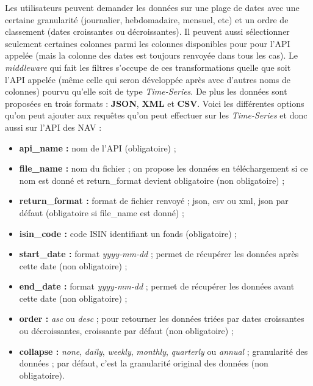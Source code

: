 \vspace{3mm}

Les utilisateurs peuvent demander les données sur une plage de dates avec une certaine granularité (journalier, hebdomadaire, mensuel, etc) et un ordre de classement (dates croissantes ou décroissantes). Il peuvent aussi sélectionner seulement certaines colonnes parmi les colonnes disponibles pour pour l'API appelée (mais la colonne des dates est toujours renvoyée dans tous les cas). Le \textit{middleware} qui fait les filtres s'occupe de ces transformations quelle que soit l'API appelée (même celle qui seron développée après avec d'autres noms de colonnes) pourvu qu'elle soit de type  \textit{Time-Series}. De plus les données sont proposées en trois formats : \textbf{JSON}, \textbf{XML} et \textbf{CSV}. Voici les différentes options qu'on peut ajouter aux requêtes qu'on peut effectuer sur les \textit{Time-Series} et donc aussi sur l'API des NAV :

\begin{itemize}[font=\color{blue}, label=]
  \item \textbf{api\_name :} nom de l'API (obligatoire) ;
  \item \textbf{file\_name :} nom du fichier ; on propose les données en téléchargement si ce nom est donné et return\_format devient obligatoire (non obligatoire) ;
  \item \textbf{return\_format :} format de fichier renvoyé ; json, csv ou xml, json par défaut (obligatoire si file\_name est donné) ;
  \item \textbf{isin\_code :} code ISIN identifiant un fonds (obligatoire) ;
  \item \textbf{start\_date :} format \textit{yyyy-mm-dd} ; permet de récupérer les données après cette date (non obligatoire) ;
  \item \textbf{end\_date :} format \textit{yyyy-mm-dd} ; permet de récupérer les données avant cette date (non obligatoire) ;
  \item \textbf{order :} \textit{asc} ou \textit{desc} ; pour retourner les données triées par dates croissantes ou décroissantes, croissante par défaut (non obligatoire) ;
  \item \textbf{collapse :} \textit{none}, \textit{daily}, \textit{weekly}, \textit{monthly}, \textit{quarterly} ou \textit{annual} ; granularité des données ; par défaut, c'est la granularité original des données (non obligatoire).
\end{itemize}

